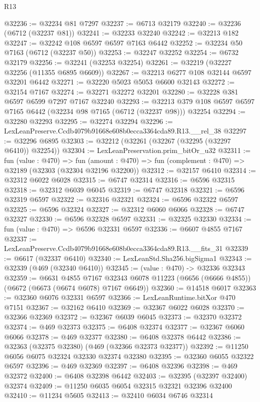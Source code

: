 \begin{lexlean}{R13}
\begin{coremodule}
@32236 := @32234 @81 @7297
@32237 := @6713 @32179
@32240 := @32236 (@6712 (@32237 @81))
@32241 := @32233 @32240
@32242 := @32213 @182
@32247 := @32242 @108 @6597 @6597 @7163 @6442
@32252 := @32234 @50 @7163 (@6712 (@32237 @50))
@32253 := @32247 @32252
@32254 := @6732 @32179
@32256 := @32241 (@32253 @32254)
@32261 := @32219 (@32227 @32256 (@11355 @6895 @6609))
@32267 := @32213 @6277 @108 @32144 @6597 @32201 @6442
@32271 := @32220 @5023 @5053 @6600 @32143
@32272 := @32154 @7167
@32274 := @32271 @32272 @32201
@32280 := @32228 @381 @6597 @6599 @7297 @7167 @32240
@32293 := @32213 @379 @108 @6597 @6597 @7165 @6442 (@32234 @98 @7165 (@6712 (@32237 @98))) @32254
@32294 := @32280 @32293
@32295 := @32274 @32294
@32296 := LexLeanPreserve.Ccdb4079b91668e608b0ecca3364cda89.R13.__rel_38
@32297 := @32296 @6895
@32303 := @32212 (@32261 (@32267 (@32295 (@32297 @6410)) @32254))
@32304 := LexLeanPreservation.prim_bitOr_u32
@32311 := fun (value : @470) =>
  fun (amount : @470) => fun (complement : @470) => @32189 (@32303 (@32304 @32196 @32200))
@32312 := @32157 @6410
@32314 := @32312 @6022 @6028
@32315 := @6747 @32314
@32316 := @6596 @32315
@32318 := @32312 @6039 @6045
@32319 := @6747 @32318
@32321 := @6596 @32319 @6597
@32322 := @32316 @32321
@32324 := @6596 @32322 @6597
@32325 := @6596 @32324
@32327 := @32312 @6060 @6066
@32328 := @6747 @32327
@32330 := @6596 @32328 @6597
@32331 := @32325 @32330
@32334 := fun (value : @470) => @6596 @32331 @6597
@32336 := @6607 @4855 @7167
@32337 := LexLeanPreserve.Ccdb4079b91668e608b0ecca3364cda89.R13.__fits_31
@32339 := @6617 (@32337 @6410)
@32340 := LexLeanStd.Sha256.bigSigma1
@32343 := @32339 (@469 (@32340 @6410))
@32345 := (value : @470) -> @32336 @32343
@32359 := @6631
    @4855
    @7167
    @32343
    @6078
    @11223
    (@6656 (@6666 @4855))
    (@6672 (@6673 (@6674 @6078) @7167 @6649))
@32360 := @14518 @6017
@32363 := @32360 @6076 @32331 @6597
@32366 := LexLeanRuntime.bitXor @470 @7151
@32367 := @32162 @6410
@32369 := @32367 @6022 @6028
@32370 := @32366 @32369
@32372 := @32367 @6039 @6045
@32373 := @32370 @32372
@32374 := @469 @32373
@32375 := @6408 @32374
@32377 := @32367 @6060 @6066
@32378 := @469 @32377
@32380 := @6408 @32378 @6442
@32386 := @32363 (@32375 @32380) (@469 (@32366 @32373 @32377))
@32392 := @11250 @6056 @6075 @32324 @32330 @32374 @32380
@32395 := @32360 @6055 @32322 @6597
@32396 := @469 @32369
@32397 := @6408 @32396
@32398 := @469 @32372
@32400 := @6408 @32398 @6442
@32403 := @32395 (@32397 @32400) @32374
@32409 := @11250 @6035 @6054 @32315 @32321 @32396 @32400
@32410 := @11234 @5605
@32413 := @32410 @6034 @6746 @32314

\end{coremodule}
\end{lexlean}

